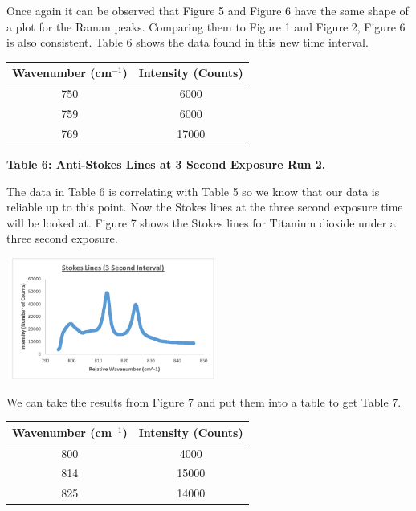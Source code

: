 \documentclass[]{article}
\begin{document}
\begin{multicols}{2}
\begin{center}
    \caption{\textbf{\small{Figure 6:} Anti-Stokes Lines at 3 Second Exposure Run 2.}}
\end{center}
Once again it can be observed that Figure 5 and Figure 6 have the same shape of a plot for the Raman peaks. Comparing them to Figure 1 and Figure 2, Figure 6 is also consistent. Table 6 shows the data found in this new time interval.
\newline
\begin{tabular}{|c|c|}
    \hline \textbf{Wavenumber (cm$^{-1}$)} & \textbf{Intensity (Counts)} \\ \hline
    750 & 6000 \\ \hline
    759 & 6000 \\ \hline
    769 & 17000 \\ \hline
\end{tabular}
\centerline{\tiny\textbf{{Table 6: Anti-Stokes Lines at 3 Second Exposure Run 2.}}}
\newline
The data in Table 6 is correlating with Table 5 so we know that our data is reliable up to this point. Now the Stokes lines at the three second exposure time will be looked at. Figure 7 shows the Stokes lines for Titanium dioxide under a three second exposure. 
\begin{center}
    \includegraphics[width=7cm, height=4cm]{PHYS 331 RS (3 Sec) 1b.png}
    \caption{\textbf{\small{Figure 7:} Stokes Lines at 3 Second Exposure Run 1.}}
\end{center}
We can take the results from Figure 7 and put them into a table to get Table 7.
\newline
\begin{tabular}{|c|c|}
    \hline \textbf{Wavenumber (cm$^{-1}$)} & \textbf{Intensity (Counts)} \\ \hline
    800 & 4000 \\ \hline
    814 & 15000 \\ \hline
    825 & 14000 \\ \hline
\end{tabular}

\end{multicols}
\end{document}
